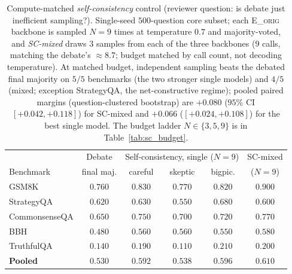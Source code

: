 \begin{table}[t]
\centering\small
\caption{Compute-matched \emph{self-consistency} control (reviewer question: is debate just inefficient
sampling?). Single-seed $500$-question core subset; each \textsc{E\_orig} backbone is sampled $N=9$ times at
temperature $0.7$ and majority-voted, and \emph{SC-mixed} draws $3$ samples from each of the three backbones
($9$ calls, matching the debate's $\approx\!8.7$; budget matched by call count, not decoding temperature). At
matched budget, independent sampling beats the debated final majority on $5/5$ benchmarks (the two stronger
single models) and $4/5$ (mixed; exception StrategyQA, the net-constructive regime); pooled paired margins
(question-clustered bootstrap) are $+0.080$ ($95\%$ CI $[+0.042,+0.118]$) for SC-mixed and $+0.066$
($[+0.024,+0.108]$) for the best single model. The budget ladder $N\in\{3,5,9\}$ is in Table~\ref{tab:sc_budget}.}
\label{tab:selfconsistency}
\begin{tabular}{lccccc}
\toprule
 & Debate & \multicolumn{3}{c}{Self-consistency, single ($N{=}9$)} & SC-mixed \\
Benchmark & final maj. & careful & skeptic & bigpic. & ($N{=}9$) \\
\midrule
GSM8K         & $0.760$ & $0.830$ & $0.770$ & $0.820$ & $0.900$ \\
StrategyQA    & $0.620$ & $0.630$ & $0.550$ & $0.680$ & $0.600$ \\
CommonsenseQA & $0.650$ & $0.750$ & $0.700$ & $0.720$ & $0.770$ \\
BBH           & $0.480$ & $0.560$ & $0.560$ & $0.550$ & $0.580$ \\
TruthfulQA    & $0.140$ & $0.190$ & $0.110$ & $0.210$ & $0.200$ \\
\midrule
\textbf{Pooled} & $\mathbf{0.530}$ & $0.592$ & $0.538$ & $\mathbf{0.596}$ & $\mathbf{0.610}$ \\
\bottomrule
\end{tabular}
\end{table}


